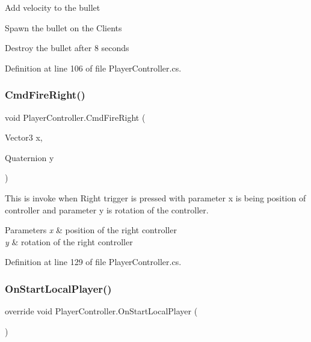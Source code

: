 Add velocity to the bullet

Spawn the bullet on the Clients

Destroy the bullet after 8 seconds 

Definition at line 106 of file Player\+Controller.\+cs.

\mbox{\label{class_player_controller_af9d10173a13edf187e48ee031d1046c8}} 
\subsubsection{\texorpdfstring{CmdFireRight()}{CmdFireRight()}}
{\footnotesize\ttfamily void Player\+Controller.\+Cmd\+Fire\+Right (\begin{DoxyParamCaption}\item[{Vector3}]{x,  }\item[{Quaternion}]{y }\end{DoxyParamCaption})}



This is invoke when Right trigger is pressed with parameter x is being position of controller and parameter y is rotation of the controller. 


\begin{DoxyParams}{Parameters}
{\em x} & position of the right controller\\
\hline
{\em y} & rotation of the right controller\\
\hline
\end{DoxyParams}


Definition at line 129 of file Player\+Controller.\+cs.

\mbox{\label{class_player_controller_aa274be913417ca85d0cf5fc0afd93696}} 
\subsubsection{\texorpdfstring{OnStartLocalPlayer()}{OnStartLocalPlayer()}}
{\footnotesize\ttfamily override void Player\+Controller.\+On\+Start\+Local\+Player (\begin{DoxyParamCaption}{ }\end{DoxyParamCaption})}



